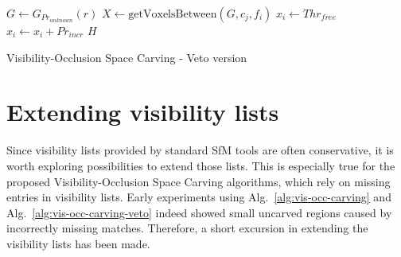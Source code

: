 {\singlespacing
\begin{algorithm}[!h]
  \centering
  \begin{algorithmic}[1]
      \State $G \gets G_{Pr_{unknown}}(r)$ 
           
            \State $X \gets \mathrm{getVoxelsBetween}(G, c_j, f_i)$ 
             
                \State $x_i \gets Thr_{free}$ 
              \EndFor
            \Else {}
                 
                  \State $x_i \gets x_i + Pr_{incr}$ 
                \EndIf
              \EndFor
            \EndIf
          \EndIf
        \EndFor
      \EndFor
      \State \Return $H$
    \EndFunction
  \end{algorithmic}
  \caption{Visibility-Occlusion Space Carving - Veto version}
  \label{alg:vis-occ-carving-veto}
\end{algorithm}
}

\section{Extending visibility lists}  \label{extend-vis-lists}
Since visibility lists provided by standard SfM tools are often conservative, it is worth exploring possibilities to extend those lists. This is especially true for the proposed Visibility-Occlusion Space Carving algorithms, which rely on missing entries in visibility lists. Early experiments using Alg.~\ref{alg:vis-occ-carving} and Alg.~\ref{alg:vis-occ-carving-veto} indeed showed small uncarved regions caused by incorrectly missing matches. Therefore, a short excursion in extending the visibility lists has been made.

